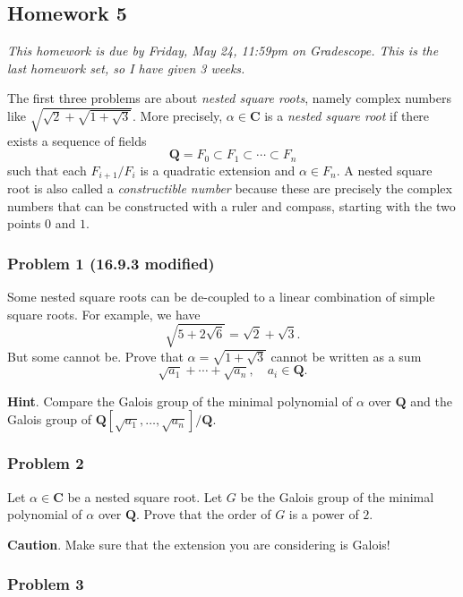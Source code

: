\documentclass[11pt]{article}
\begin{document}
\subsection{Homework 5}
\label{sec:org5cddb46}
\emph{This homework is due by Friday, May 24, 11:59pm on Gradescope.  This is the last homework set, so I have given 3 weeks.}
\bigskip

The first three problems are about \emph{nested square roots}, namely complex numbers like \(\sqrt{\sqrt 2 + \sqrt{1 + \sqrt 3}}\).
More precisely, \(\alpha \in \mathbf{C}\) is a \emph{nested square root} if there exists a sequence of fields
\[ \mathbf{Q} = F_0 \subset F_1 \subset \cdots \subset F_n\]
such that each \(F_{i+1}/F_{i}\) is a quadratic extension and \(\alpha \in F_{n}\).
A nested square root is also called a \emph{constructible number} because these are precisely the complex numbers that can be constructed with a ruler and compass, starting with the two points \(0\) and \(1\).
\subsubsection{Problem 1  (16.9.3 modified)}
\label{sec:org5ef0ec9}

Some nested square roots can be de-coupled to a linear combination of simple square roots.
For example, we have
\[ \sqrt {5 + 2\sqrt 6} = \sqrt 2 + \sqrt 3.\]
But some cannot be.
Prove that \(\alpha = \sqrt{1 + \sqrt 3}\) cannot be written as a sum
\[ \sqrt{a_{1}} + \cdots + \sqrt{a_{n}}, \quad a_i \in \mathbf{Q}.\]

\textbf{Hint}. Compare the Galois group of the minimal polynomial of \(\alpha\) over \(\mathbf{Q}\) and the Galois group of \(\mathbf{Q}[\sqrt{a_1}, \dots, \sqrt{a_n}] / \mathbf{Q}.\)
\subsubsection{Problem 2}
\label{sec:org28cc69b}

Let \(\alpha \in \mathbf{C}\) be a nested square root.
Let \(G\) be the Galois group of the minimal polynomial of \(\alpha\) over \(\mathbf{Q}\).
Prove that the order of \(G\) is a power of \(2\).

\textbf{Caution}. Make sure that the extension you are considering is Galois!
\subsubsection{Problem 3}
\label{sec:org7078a66}
\end{document}
